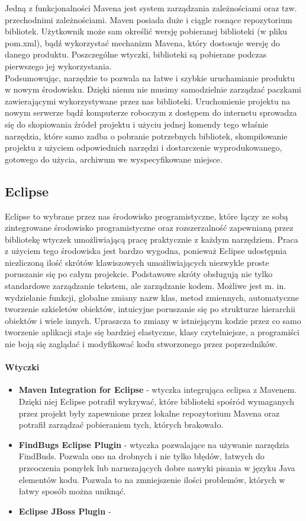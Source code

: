 \documentclass[licencjacka]{pracamgr}
\begin{document}
Jedną z funkcjonalności Mavena jest system zarządzania zależnościami oraz tzw. przechodnimi zależnościami.
Maven posiada duże i ciągle rosnące repozytorium bibliotek. Użytkownik może sam określić wersję pobieranej biblioteki (w pliku pom.xml), bądź wykorzystać mechanizm Mavena, 
który dostosuje wersję do danego produktu. Poszczególne wtyczki, biblioteki są pobierane podczas pierwszego jej wykorzystania.  \\

Podsumowując, narzędzie to pozwala na łatwe i szybkie uruchamianie produktu w nowym środowisku. Dzięki niemu nie musimy samodzielnie zarządzać paczkami zawierającymi wykorzystywane przez nas biblioteki. Uruchomienie projektu na nowym serwerze bądź komputerze roboczym z dostępem do internetu sprowadza się do skopiowania źródeł projektu i użyciu jednej komendy tego właśnie narzędzia, które samo zadba o pobranie potrzebnych bibliotek, skompilowanie projektu z użyciem odpowiednich narzędzi i dostarczenie wyprodukowanego, gotowego do użycia, archiwum we wyspecyfikowane miejsce.
\subsection{Eclipse}

Eclipse to wybrane przez nas środowisko programistyczne, które łączy ze sobą zintegrowane środowisko programistyczne oraz rozszerzalność zapewnianą przez bibliotekę wtyczek umożliwiającą pracę praktycznie z każdym narzędziem. Praca z użyciem tego środowiska jest bardzo wygodna, ponieważ Eclipse udostępnia niezliczoną ilość skrótów klawiszowych umożliwiających niezwykle proste poruszanie się po całym projekcie. Podstawowe skróty obsługują nie tylko standardowe zarządzanie tekstem, ale zarządzanie kodem. Możliwe jest m. in. wydzielanie funkcji, globalne zmiany nazw klas, metod zmiennych, automatyczne tworzenie szkieletów obiektów, intuicyjne poruszanie się po strukturze hierarchii obiektów i wiele innych. Upraszcza to zmiany w istniejącym kodzie przez co samo tworzenie aplikacji staje się bardziej elastyczne, klasy czytelniejsze, a programiści nie boją się zaglądać i modyfikować kodu stworzonego przez poprzedników.

\paragraph{Wtyczki}
\begin{itemize}
\item \textbf{Maven Integration for Eclipse} - wtyczka integrująca eclipsa z Mavenem. Dzięki niej Eclipse potrafił wykrywać, które biblioteki spośród wymaganych przez projekt były zapewnione przez lokalne repozytorium Mavena oraz potrafił zarządzać pobieraniem tych, których brakowało.
\item \textbf{FindBugs Eclipse Plugin} - wtyczka pozwalające na używanie narzędzia FindBuds. Pozwala ono na drobnych i nie tylko błędów, łatwych do przeoczenia pomyłek lub naruszających dobre nawyki pisania w języku Java elementów kodu. Pozwala to na zmniejszenie ilości problemów, których w łatwy sposób można uniknąć.
\item \textbf{Eclipse JBoss Plugin} - 
\end{itemize}
\end{document}
